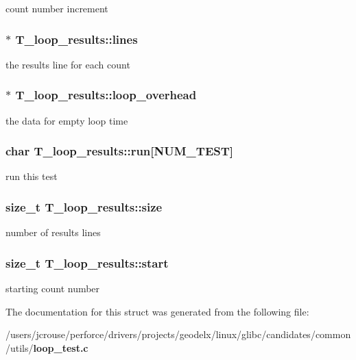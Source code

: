count number increment 
\subsubsection{$\ast$ T\_\-loop\_\-results::lines}\label{structT__loop__results_m4}


the results line for each count 
\subsubsection{$\ast$ T\_\-loop\_\-results::loop\_\-overhead}\label{structT__loop__results_m3}


the data for empty loop time 
\subsubsection{\setlength{\rightskip}{0pt plus 5cm}char T\_\-loop\_\-results::run[NUM\_\-TEST]}\label{structT__loop__results_m5}


run this test 
\subsubsection{\setlength{\rightskip}{0pt plus 5cm}size\_\-t T\_\-loop\_\-results::size}\label{structT__loop__results_m0}


number of results lines 
\subsubsection{\setlength{\rightskip}{0pt plus 5cm}size\_\-t T\_\-loop\_\-results::start}\label{structT__loop__results_m1}


starting count number 

The documentation for this struct was generated from the following file:\begin{CompactItemize}
\item 
/users/jcrouse/perforce/drivers/projects/geodelx/linux/glibc/candidates/common/utils/{\bf loop\_\-test.c}\end{CompactItemize}
